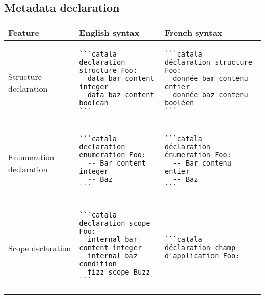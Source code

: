 \documentclass[a3paper,landscape]{article}
\begin{document}
\begin{multicols*}{2}
  \section*{Metadata declaration}
  \begin{tabular}{p{}p{}p{}}
    \toprule
    Feature                 & English syntax & French syntax \\\midrule
    Structure declaration   &
    \vspace*{-1.75em}
    \begin{verbatim}
```catala
declaration structure Foo:
  data bar content integer
  data baz content boolean
```
\end{verbatim}
    \vspace*{-1.75em}
                            &
    \vspace*{-1.75em}
    \begin{verbatim}
```catala
déclaration structure Foo:
  donnée bar contenu entier
  donnée baz contenu booléen
```
\end{verbatim}
    \vspace*{-1.75em}
    \\
    Enumeration declaration &
    \vspace*{-1.75em}
    \begin{verbatim}
```catala
declaration enumeration Foo:
  -- Bar content integer
  -- Baz
```
\end{verbatim}
    \vspace*{-1.75em}
                            &
    \vspace*{-1.75em}
    \begin{verbatim}
```catala
déclaration énumeration Foo:
  -- Bar contenu entier
  -- Baz
```
\end{verbatim}
    \vspace*{-1.75em}                                        \\
    Scope declaration       &
    \vspace*{-1.75em}
    \begin{verbatim}
```catala
declaration scope Foo:
  internal bar content integer
  internal baz condition
  fizz scope Buzz
```
\end{verbatim}
    \vspace*{-1.75em}
                            &
    \vspace*{-1.75em}
    \begin{verbatim}
```catala
déclaration champ d'application Foo:

\end{verbatim}
\end{tabular}
\end{multicols*}
\end{document}
